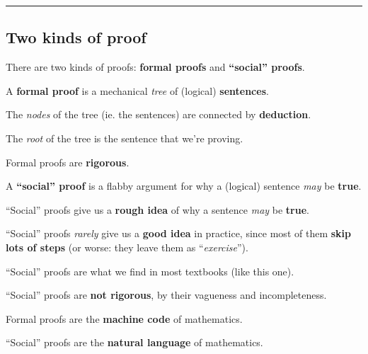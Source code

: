 

\vs\hrule\vskip1pt
\subsection{\bf Two kinds of proof}

There are two kinds of proofs: {\bf formal proofs} and {\bf``social'' proofs}. \par

\vs
A {\bf formal proof} is a mechanical {\it tree} of (logical) {\bf sentences}. \par %
The {\it nodes} of the tree (ie. the sentences) are connected by {\bf deduction}. \par
The {\it root} of the tree is the sentence that we're proving. \par
Formal proofs are {\bf rigorous}. \par

\vs
A {\bf ``social'' proof} is a flabby argument for why a (logical) sentence {\it may} be {\bf true}. \par
``Social'' proofs give us a {\bf rough idea} of why a sentence {\it may} be {\bf true}. \par
``Social'' proofs {\it rarely} give us a {\bf good idea} in practice, since most of them {\bf skip lots of steps} (or worse: they leave them as ``{\it exercise}''). \par
``Social'' proofs are what we find in most textbooks (like this one). \par
``Social'' proofs are {\bf not rigorous}, by their vagueness and incompleteness. \par

\vs
Formal     proofs are the {\bf machine code}     of mathematics. \par
``Social'' proofs are the {\bf natural language} of mathematics. \par

